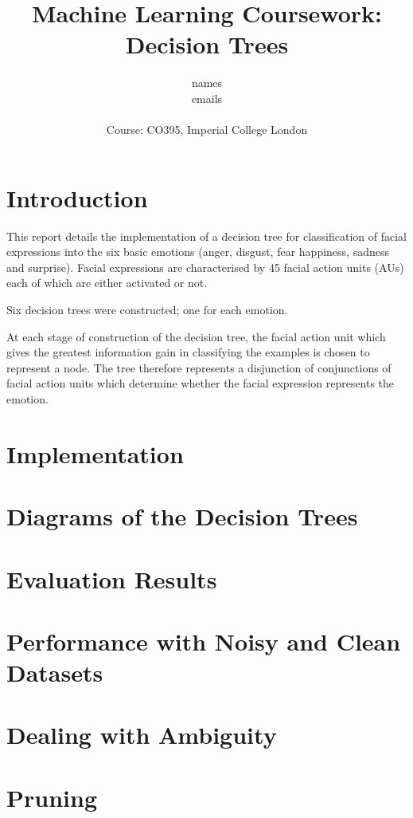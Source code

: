 \documentclass[a4paper,11pt]{article}
\title{Machine Learning Coursework: Decision Trees}
\author{names\\
       emails\\ \\
       \small{Course: CO395, Imperial College London}
}
\begin{document}
\maketitle

\section{Introduction}

This report details the implementation of a decision tree for classification of facial expressions into the six basic emotions (anger, disgust, fear happiness, sadness and surprise). Facial expressions are characterised by 45 facial action units (AUs) each of which are either activated or not.

Six decision trees were constructed; one for each emotion.

At each stage of construction of the decision tree, the facial action unit which gives the greatest information gain in classifying the examples is chosen to represent a node. The tree therefore represents a disjunction of conjunctions of facial action units which determine whether the facial expression represents the emotion.

\section{Implementation}

\section{Diagrams of the Decision Trees}

\section{Evaluation Results}

\section{Performance with Noisy and Clean Datasets}

\section{Dealing with Ambiguity}

\section{Pruning}
\end{document}
